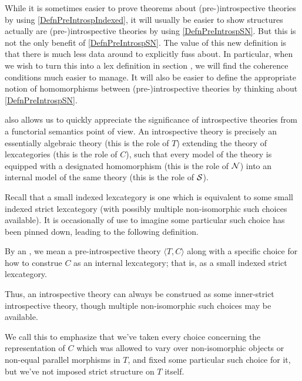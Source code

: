 While it is sometimes easier to prove theorems about (pre-)introspective theories by using \cref{DefnPreIntrospIndexed}, it will usually be easier to show structures actually are (pre-)introspective theories by using \cref{DefnPreIntrospSN}. But this is not the only benefit of \cref{DefnPreIntrospSN}. The value of this new definition is that there is much less data around to explicitly fuss about. In particular, when we wish to turn this into a lex definition in section \TODO, we will find the coherence conditions much easier to manage. It will also be easier to define the appropriate notion of homomorphisms between (pre-)introspective theories by thinking about \cref{DefnPreIntrospSN}.

 also allows us to quickly appreciate the significance of introspective theories from a functorial semantics point of view. An introspective theory is precisely an essentially algebraic theory (this is the role of $T$) extending the theory of lexcategories (this is the role of $C$), such that every model of the theory is equipped with a designated homomorphism (this is the role of $\mathcal{N}$) into an internal model of the same theory (this is the role of $\mathcal{S}$).

Recall that a small indexed lexcategory is one which is equivalent to some small indexed strict lexcategory (with possibly multiple non-isomorphic such choices available). It is occasionally of use to imagine some particular such choice has been pinned down, leading to the following definition.

\begin{definition}
By an , we mean a pre-introspective theory $\langle T, C\rangle$ along with a specific choice for how to construe $C$ as an internal lexcategory; that is, as a small indexed strict lexcategory.
\end{definition}

Thus, an introspective theory can always be construed as some inner-strict introspective theory, though multiple non-isomorphic such choices may be available. 

We call this  to emphasize that we've taken every choice concerning the representation of $C$ which was allowed to vary over non-isomorphic objects or non-equal parallel morphisms in $T$, and fixed some particular such choice for it, but we've not imposed strict structure on $T$ itself.

